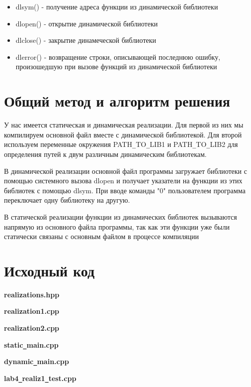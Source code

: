 \documentclass[a4paper, 14pt]{article}
\begin{document}
\begin{itemize}
    \item dlsym() - получение адреса функции из динамической библиотеки
    \item dlopen() - открытие динамической библиотеки
    \item dlclose() - закрытие динамеческой библиотеки
    \item dlerror() - возвращение строки, описывающей последнюю ошибку, произошедшую при вызове функций из динамической библиотеки
\end{itemize}

\section*{Общий метод и алгоритм решения}

У нас имеется статическая и динамическая реализации. Для первой из них мы компилируем основной файл вместе с динамической библиотекой. Для второй используем переменные окружения PATH\texttt{\_}TO\texttt{\_}LIB1 и PATH\texttt{\_}TO\texttt{\_}LIB2 для определения путей к двум различным динамическим библиотекам. 

В динамической реализации основной файл программы загружает библиотеки с помощью системного вызова dlopen и получает указатели на функции из этих библиотек с помощью dlsym. При вводе команды "0" пользователем программа переключает одну библиотеку на другую.

В статической реализации функции из динамических библиотек вызываются напрямую из основного файла программы, так как эти функции уже были статически связаны с основным файлом в процессе компиляции
\newpage

\section*{Исходный код}

\textbf{realizations.hpp}


\textbf{realization1.cpp}


\textbf{realization2.cpp}


\textbf{static\texttt{\_}main.cpp}


\textbf{dynamic\texttt{\_}main.cpp}


\textbf{lab4\texttt{\_}realiz1\texttt{\_}test.cpp}

\end{document}
